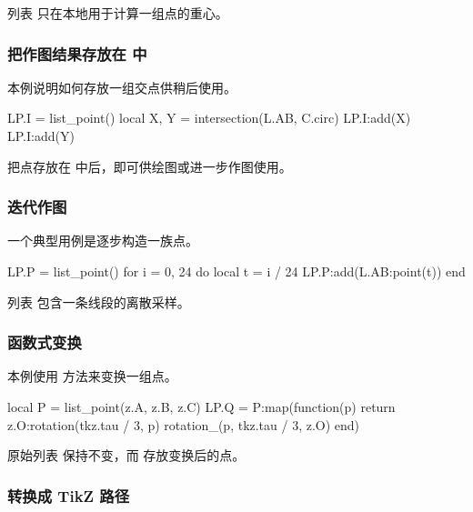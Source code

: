 列表  只在本地用于计算一组点的重心。

\subsubsection{把作图结果存放在  中}
\label{ssub:list_point_example_lp}

本例说明如何存放一组交点供稍后使用。

\begin{tkzexample}
LP.I = list_point()
local X, Y = intersection(L.AB, C.circ)
LP.I:add(X)
LP.I:add(Y)
\end{tkzexample}

把点存放在  中后，即可供绘图或进一步作图使用。

\subsubsection{迭代作图}
\label{ssub:list_point_example_iterative}

一个典型用例是逐步构造一族点。

\begin{tkzexample}
LP.P = list_point()
for i = 0, 24 do
  local t = i / 24
  LP.P:add(L.AB:point(t))
end
\end{tkzexample}

列表  包含一条线段的离散采样。

\subsubsection{函数式变换}
\label{ssub:list_point_example_map}

本例使用  方法来变换一组点。

\begin{tkzexample}
local P = list_point(z.A, z.B, z.C)
LP.Q = P:map(function(p)
  return z.O:rotation(tkz.tau / 3, p) rotation_(p, tkz.tau / 3, z.O)
end)
\end{tkzexample}

原始列表  保持不变，而  存放变换后的点。

\subsubsection{转换成 TikZ 路径}
\label{ssub:list_point_example_path}

